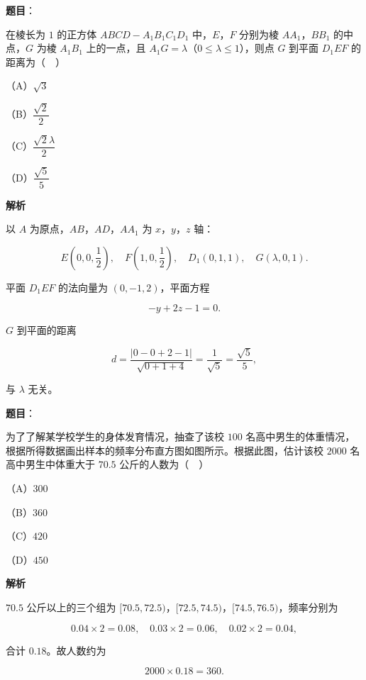 \begin{answer}

\textbf{题目}：

在棱长为 $1$ 的正方体 $ABCD-A_1B_1C_1D_1$ 中，$E$，$F$ 分别为棱 $AA_1$，$BB_1$ 的中点，$G$ 为棱 $A_1B_1$ 上的一点，且 $A_1G=\lambda$（$0\leqslant\lambda\leqslant1$），则点 $G$ 到平面 $D_1EF$ 的距离为（　）
\nopagebreak[4]
\begin{center}\end{center}
\nopagebreak[4]
（A）$\sqrt3$

（B）$\dfrac{\sqrt2}{2}$

（C）$\dfrac{\sqrt2\lambda}{2}$

（D）$\dfrac{\sqrt5}{5}$

\textbf{解析}

以 $A$ 为原点，$AB$，$AD$，$AA_1$ 为 $x$，$y$，$z$ 轴：

\nopagebreak[4]
\[E\left(0,0,\frac12\right),\quad F\left(1,0,\frac12\right),\quad D_1(0,1,1),\quad G(\lambda,0,1).\]

平面 $D_1EF$ 的法向量为 $(0,-1,2)$，平面方程

\nopagebreak[4]
\[-y+2z-1=0.\]

$G$ 到平面的距离

\nopagebreak[4]
\[d=\frac{|0-0+2-1|}{\sqrt{0+1+4}}=\frac1{\sqrt5}=\frac{\sqrt5}{5},\]

与 $\lambda$ 无关。


\end{answer}
\begin{answer}

\textbf{题目}：

为了了解某学校学生的身体发育情况，抽查了该校 $100$ 名高中男生的体重情况，根据所得数据画出样本的频率分布直方图如图所示。根据此图，估计该校 $2000$ 名高中男生中体重大于 $70.5$ 公斤的人数为（　）
\nopagebreak[4]
\begin{center}\end{center}
\nopagebreak[4]
（A）$300$

（B）$360$

（C）$420$

（D）$450$

\textbf{解析}

$70.5$ 公斤以上的三个组为 $[70.5,72.5)$，$[72.5,74.5)$，$[74.5,76.5)$，频率分别为

\nopagebreak[4]
\[0.04\times2=0.08,\quad0.03\times2=0.06,\quad0.02\times2=0.04,\]

合计 $0.18$。故人数约为

\nopagebreak[4]
\[2000\times0.18=360.\]


\end{answer}
